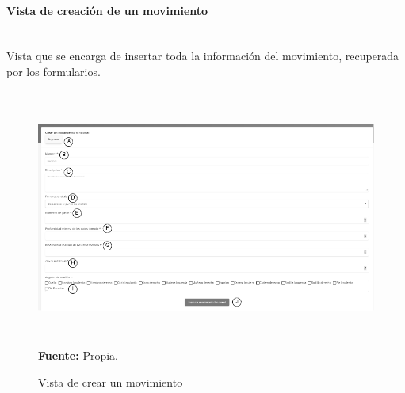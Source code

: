 \paragraph{Vista de creaci\'on de un movimiento}\mbox{} \\ \label{ins:UI:web:create}
Vista que se encarga de insertar toda la informaci\'on del movimiento, recuperada por los formularios.
\begin{figure}[H]
	\caption{Vista de crear un movimiento}
	\label{fig:viewCreate}
	\centering
	\includegraphics[width=460px,height=320px]{graphics/web-create.PNG} \\
	\textbf{Fuente:} Propia.
\end{figure}
